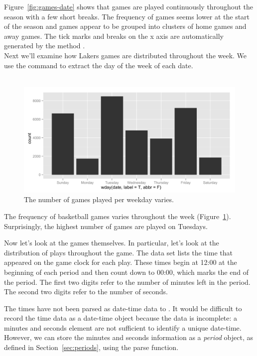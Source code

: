 \documentclass[article]{jss}
\begin{document}
Figure~\ref{fig:games-date} shows that games are played continuously throughout the season with a few short breaks. The frequency of games seems lower at the start of the season and games appear to be grouped into clusters of home games and away games. The tick marks and breaks on the x axis are automatically generated by the  method .\\

Next we'll examine how Lakers games are distributed throughout the week. We use the  command to extract the day of the week of each date.\\

\\

\begin{figure}[htpb]
  \centering    
    \includegraphics[width=\textwidth]{weekdays-histogram.png}     
  \caption{The number of games played per weekday varies.}
  \label{fig:games-days}
\end{figure}


The frequency of basketball games varies throughout the week (Figure~\ref{fig:games-days}). Surprisingly, the highest number of games are played on Tuesdays.

Now let's look at the games themselves. In particular, let's look at the distribution of plays throughout the game. The  data set lists the time that appeared on the game clock for each play. These times begin at 12:00 at the beginning of each period and then count down to 00:00, which marks the end of the period. The first two digits refer to the number of minutes left in the period. The second two digits refer to the number of seconds.

The times have not been parsed as date-time data to . It would be difficult to record the time data as a date-time object because the data is incomplete: a minutes and seconds element are not sufficient to identify a unique date-time. However, we can store the minutes and seconds information as a \emph{period} object, as defined in Section~\ref{sec:periods}, using the  parse function.\\
\end{document}
